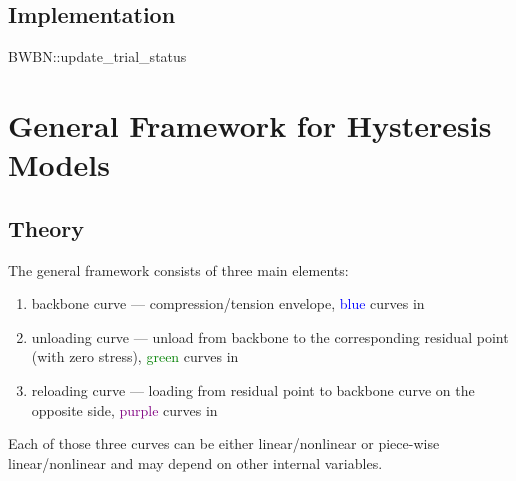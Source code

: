 \subsection{Implementation}
\begin{cppcode}
	BWBN::update_trial_status
\end{cppcode}
\section{General Framework for Hysteresis Models}
\subsection{Theory}
The general framework consists of three main elements:
\begin{enumerate}
\item backbone curve --- compression/tension envelope, \textcolor{blue}{blue} curves in 
\item unloading curve --- unload from backbone to the corresponding residual point (with zero stress), \textcolor{green}{green} curves in 
\item reloading curve --- loading from residual point to backbone curve on the opposite side, \textcolor{purple}{purple} curves in 
\end{enumerate}
Each of those three curves can be either linear/nonlinear or piece-wise linear/nonlinear and may depend on other internal variables.

